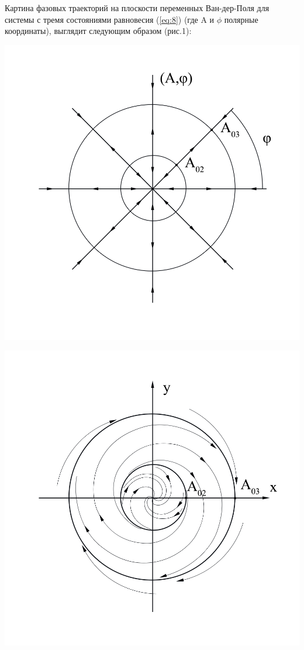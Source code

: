 Картина фазовых траекторий на плоскости переменных Ван-дер-Поля для системы с тремя состояниями равновесия (\ref{eq:8}) (где A и $\phi$ полярные координаты), выглядит следующим образом (рис.1): 

\begin{center}
    \begin{minipage}{0.49\linewidth}
        \includegraphics[width=\linewidth]{pics/Ris1.png} 
        \vspace{-50pt}
        \label{fig:1}
    \end{minipage}
\hfill     
    \begin{minipage}{0.49\linewidth}
        \centering
        \includegraphics[width=\linewidth]{pics/Ris2.png}  

\end{minipage}
\end{center}
